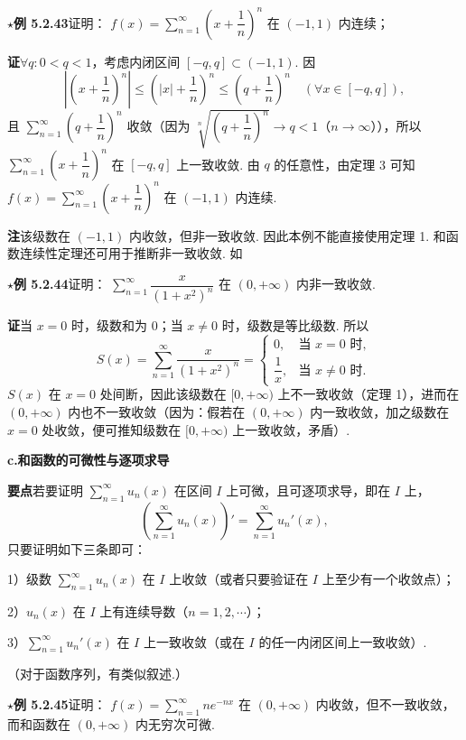 \documentclass[UTF8,12pt,a4paper,fontset=fandol]{ctexart}
\begin{document}
\noindent\textbf{$\star$例 5.2.43}\quad 证明：
$f(x)=\displaystyle\sum_{n=1}^{\infty}\left(x+\dfrac1n\right)^n$ 在
$(-1,1)$ 内连续；

\noindent\textbf{证}\quad $\forall q:0<q<1$，考虑内闭区间 $[-q,q]\subset(-1,1)$. 因
\[
  \left|\left(x+\frac1n\right)^n\right|
  \le\left(|x|+\frac1n\right)^n
  \le\left(q+\frac1n\right)^n
  \quad(\forall x\in[-q,q]),
\]
且 $\displaystyle\sum_{n=1}^{\infty}\left(q+\dfrac1n\right)^n$ 收敛（因为
$\sqrt[n]{\left(q+\dfrac1n\right)^n}\to q<1$（$n\to\infty$）），所以
$\displaystyle\sum_{n=1}^{\infty}\left(x+\dfrac1n\right)^n$ 在 $[-q,q]$ 上一致收敛. 由
$q$ 的任意性，由定理 3 可知
$f(x)=\displaystyle\sum_{n=1}^{\infty}\left(x+\dfrac1n\right)^n$ 在 $(-1,1)$ 内连续.

\noindent\textbf{注}\quad 该级数在 $(-1,1)$ 内收敛，但非一致收敛. 因此本例不能直接使用定理 1. 和函数连续性定理还可用于推断非一致收敛. 如

\noindent\textbf{$\star$例 5.2.44}\quad 证明：
$\displaystyle\sum_{n=1}^{\infty}\dfrac{x}{(1+x^2)^n}$ 在 $(0,+\infty)$ 内非一致收敛.

\noindent\textbf{证}\quad 当 $x=0$ 时，级数和为 0；当 $x\ne0$ 时，级数是等比级数. 所以
\[
  S(x)=\sum_{n=1}^{\infty}\frac{x}{(1+x^2)^n}
  =
  \begin{cases}
    0,& \text{当 }x=0\text{ 时},\\
    \dfrac1x,& \text{当 }x\ne0\text{ 时}.
  \end{cases}
\]
$S(x)$ 在 $x=0$ 处间断，因此该级数在 $[0,+\infty)$ 上不一致收敛（定理 1），进而在
$(0,+\infty)$ 内也不一致收敛（因为：假若在 $(0,+\infty)$ 内一致收敛，加之级数在
$x=0$ 处收敛，便可推知级数在 $[0,+\infty)$ 上一致收敛，矛盾）.

\noindent\textbf{c.\quad 和函数的可微性与逐项求导}

\noindent\textbf{要点}\quad 若要证明 $\displaystyle\sum_{n=1}^{\infty}u_n(x)$ 在区间 $I$ 上可微，且可逐项求导，即在
$I$ 上，
\[
  \left(\sum_{n=1}^{\infty}u_n(x)\right)'
  =\sum_{n=1}^{\infty}u_n'(x),
\]
只要证明如下三条即可：

1）级数 $\displaystyle\sum_{n=1}^{\infty}u_n(x)$ 在 $I$ 上收敛（或者只要验证在
$I$ 上至少有一个收敛点）；

2）$u_n(x)$ 在 $I$ 上有连续导数（$n=1,2,\cdots$）；

3）$\displaystyle\sum_{n=1}^{\infty}u_n'(x)$ 在 $I$ 上一致收敛（或在 $I$ 的任一内闭区间上一致收敛）.

（对于函数序列，有类似叙述.）

\noindent\textbf{$\star$例 5.2.45}\quad 证明：
$f(x)=\displaystyle\sum_{n=1}^{\infty}ne^{-nx}$ 在 $(0,+\infty)$ 内收敛，但不一致收敛，而和函数在
$(0,+\infty)$ 内无穷次可微.
\end{document}
